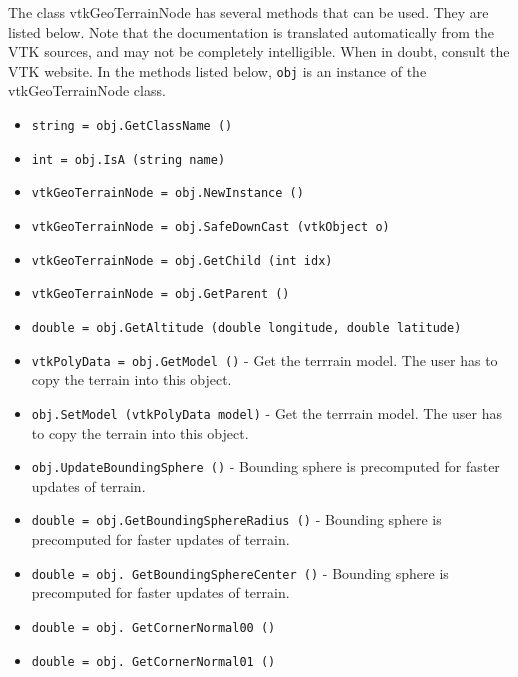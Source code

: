 The class vtkGeoTerrainNode has several methods that can be used.
  They are listed below.
Note that the documentation is translated automatically from the VTK sources,
and may not be completely intelligible.  When in doubt, consult the VTK website.
In the methods listed below, \verb|obj| is an instance of the vtkGeoTerrainNode class.
\begin{itemize}
\item  \verb|string = obj.GetClassName ()|

\item  \verb|int = obj.IsA (string name)|

\item  \verb|vtkGeoTerrainNode = obj.NewInstance ()|

\item  \verb|vtkGeoTerrainNode = obj.SafeDownCast (vtkObject o)|

\item  \verb|vtkGeoTerrainNode = obj.GetChild (int idx)|

\item  \verb|vtkGeoTerrainNode = obj.GetParent ()|

\item  \verb|double = obj.GetAltitude (double longitude, double latitude)|

\item  \verb|vtkPolyData = obj.GetModel ()| -  Get the terrrain model.  The user has to copy the terrain
 into this object.

\item  \verb|obj.SetModel (vtkPolyData model)| -  Get the terrrain model.  The user has to copy the terrain
 into this object.

\item  \verb|obj.UpdateBoundingSphere ()| -  Bounding sphere is precomputed for faster updates of terrain.

\item  \verb|double = obj.GetBoundingSphereRadius ()| -  Bounding sphere is precomputed for faster updates of terrain.

\item  \verb|double = obj. GetBoundingSphereCenter ()| -  Bounding sphere is precomputed for faster updates of terrain.

\item  \verb|double = obj. GetCornerNormal00 ()|

\item  \verb|double = obj. GetCornerNormal01 ()|


\end{itemize}
